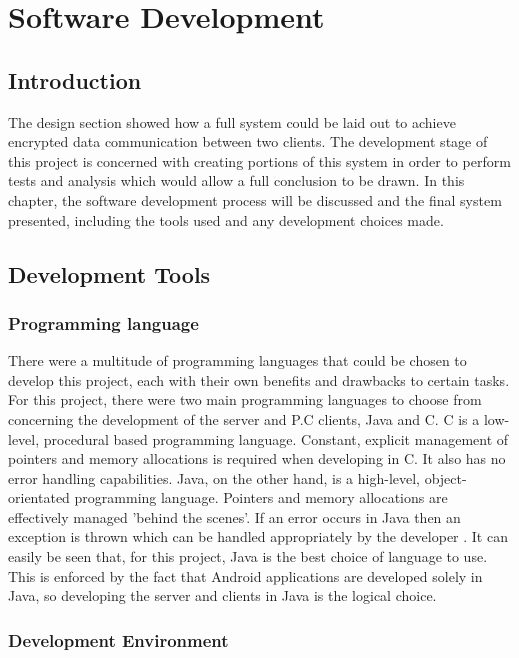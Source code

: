 \documentclass[a4paper,12pt]{report}
\begin{document}
\chapter{Software Development}

\section{Introduction}

The design section showed how a full system could be laid out to achieve encrypted data communication between two clients. The development stage of this project is concerned with creating portions of this system in order to perform tests and analysis which would allow a full conclusion to be drawn. In this chapter, the software development process will be discussed and the final system presented, including the tools used and any development choices made.

\section{Development Tools}

\subsection{Programming language}

There were a multitude of programming languages that could be chosen to develop this project, each with their own benefits and drawbacks to certain tasks. For this project, there were two main programming languages to choose from concerning the development of the server and P.C clients, Java and C. C is a low-level, procedural based programming language. Constant, explicit management of pointers and memory allocations is required when developing in C. It also has no error handling capabilities. Java, on the other hand, is a high-level, object-orientated programming language. Pointers and memory allocations are effectively managed 'behind the scenes'. If an error occurs in Java then an exception is thrown which can be handled appropriately by the developer \cite{candjava}. It can easily be seen that, for this project, Java is the best choice of language to use. This is enforced by the fact that Android applications are developed solely in Java, so developing the server and clients in Java is the logical choice. 

\subsection{Development Environment}
\end{document}
